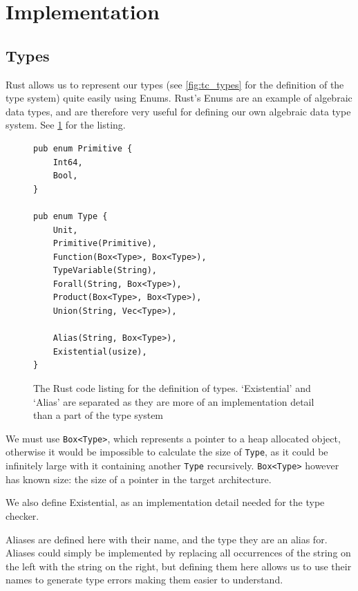 \section{Implementation}

\subsection{Types}

Rust allows us to represent our types (see \ref{fig:tc_types} for the definition of the type system) quite easily using Enums. Rust's Enums are an example of algebraic data types, and are therefore very useful for defining our own algebraic data type system. See \ref{fig:type_lst} for the listing. 

\begin{figure}[ht]
    \begin{lstlisting}[language=Rust_boxed]
pub enum Primitive {
    Int64,
    Bool,
}

pub enum Type {
    Unit,
    Primitive(Primitive),
    Function(Box<Type>, Box<Type>),
    TypeVariable(String),
    Forall(String, Box<Type>),
    Product(Box<Type>, Box<Type>),
    Union(String, Vec<Type>),

    Alias(String, Box<Type>),
    Existential(usize),
}
\end{lstlisting}
    \caption{The Rust code listing for the definition of types. `Existential' and `Alias' are separated as they are more of an implementation detail than a part of the type system}
    \label{fig:type_lst}
\end{figure}

We must use \verb|Box<Type>|, which represents a pointer to a heap allocated object, otherwise it would be impossible to calculate the size of \verb|Type|, as it could be infinitely large with it containing another \verb|Type| recursively. \verb|Box<Type>| however has known size: the size of a pointer in the target architecture. 

We also define Existential, as an implementation detail needed for the type checker. 

Aliases are defined here with their name, and the type they are an alias for. Aliases could simply be implemented by replacing all occurrences of the string on the left with the string on the right, but defining them here allows us to use their names to generate type errors making them easier to understand. 

